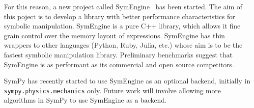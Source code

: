 For this reason, a new project called SymEngine~\cite{SymEngine} has been started.
The aim of this poject is to develop a library with better performance
characteristics for symbolic manipulation. SymEngine is a pure C++ library,
which allows it fine grain control over the memory layout of expressions.
SymEngine has thin wrappers to other languages (Python, Ruby,
Julia, etc.) whose aim is to be the fastest symbolic manipulation library. Preliminary
benchmarks suggest that SymEngine is as performant as its commercial and
open source competitors.

SymPy has recently started to use SymEngine as an
optional backend, initially in \texttt{sympy.\allowbreak{}physics.\allowbreak{}mechanics} only.
Future work will involve
allowing more algorithms in SymPy to use SymEngine as a backend.
